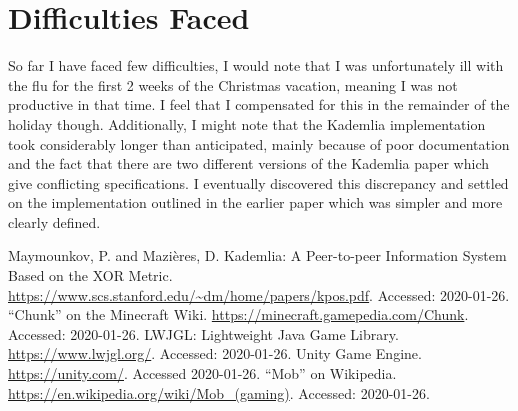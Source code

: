 \documentclass[11pt,a4paper]{article}
\begin{document}
	\section{Difficulties Faced}
	So far I have faced few difficulties, I would note that I was unfortunately ill with the flu for the first 2 weeks of the Christmas vacation, meaning I was not productive in that time. I feel that I compensated for this in the remainder of the holiday though. Additionally, I might note that the Kademlia implementation took considerably longer than anticipated, mainly because of poor documentation and the fact that there are two different versions of the Kademlia paper which give conflicting specifications. I eventually discovered this discrepancy and settled on the implementation outlined in the earlier paper which was simpler and more clearly defined.
	\begin{thebibliography}{9}
		 Maymounkov, P. and Mazières, D. Kademlia: A Peer-to-peer Information System Based on the XOR Metric. \url{https://www.scs.stanford.edu/~dm/home/papers/kpos.pdf}. Accessed: 2020-01-26.
		 ``Chunk'' on the Minecraft Wiki. \url{https://minecraft.gamepedia.com/Chunk}. Accessed: 2020-01-26.
		 LWJGL: Lightweight Java Game Library. \url{https://www.lwjgl.org/}. Accessed: 2020-01-26.
		 Unity Game Engine. \url{https://unity.com/}. Accessed 2020-01-26.
		 ``Mob'' on Wikipedia. \url{https://en.wikipedia.org/wiki/Mob_(gaming)}. Accessed: 2020-01-26.
	\end{thebibliography}
\end{document}
